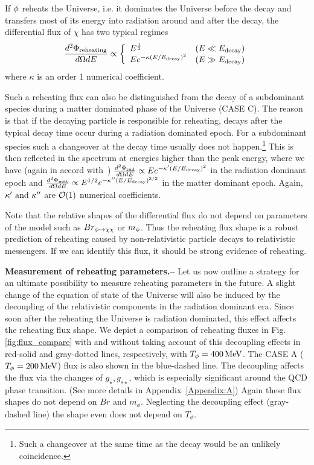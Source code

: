 \documentclass[superscriptaddress,aps,preprintnumbers,amsmath,showpacs,amssymb,prd,nofootinbib,reprint]{revtex4-1}
\begin{document}
If $\phi$ reheats the Universe, i.e. it dominates the Universe before the decay and transfers most of its energy into radiation around and after the decay, 
the differential flux of $\chi$ has two typical regimes 
\begin{align}
\frac{d^2\F_{\rm reheating}}{d \Omega d E} 
\propto 
\left\{\begin{array}{cc} 
 E^{\frac{1}{2}} ~~~~~~~~~~~~~~~~&(E\ll E_{\rm decay})\\  E e^{-\kappa(E/E_{\rm decay})^2 }& (E \gg E_{\rm decay})
\end{array}\right.\laq{rehflux}
\end{align}
where $\kappa$ is an order 1 numerical coefficient.


Such a reheating flux can also be distinguished from the decay of a subdominant species during a matter dominated phase of the Universe (CASE C). The reason is that if the decaying particle is responsible for reheating, decays after the typical decay time occur during a radiation dominated epoch. For a subdominant species such a changeover at the decay time usually does not happen.\footnote{Such a changeover at the same time as the decay would be an unlikely coincidence.} This is then reflected in the spectrum at energies higher than the peak energy, where we have (again in accord with~\cite{Conlon:2013isa})
$ \frac{d^2\Phi_{\rm rad}}{ d\Omega d E } \propto  E e^{-\kappa'(E/E_{\rm decay})^2 }$  
in the radiation dominant epoch and  
 $ \frac{d^2\Phi_{\rm mat}}{ d\Omega d E } 
\propto  E^{1/2} e^{-\kappa'' (E/E_{\rm decay})^{3/2} }$
in the matter dominant epoch. 
Again, $\kappa' ~{\rm and}~ \kappa''$ are $\mathcal{O}(1)$ numerical coefficients. 

Note that the relative shapes of the differential flux do not depend on parameters of the model such as {$Br_{\rm \phi \to \chi\chi}$} or $m_\phi$. Thus the reheating flux shape is a robust prediction of reheating caused by non-relativistic particle decays to relativistic messengers. If we can identify this flux, it should be strong evidence of reheating. 

{\bf Measurement of reheating parameters.--}
Let us now outline a strategy for an ultimate possibility to measure reheating parameters in the future.  
A slight change of the equation of state of the Universe will also be induced by the decoupling of the relativistic 
components in the radiation dominant era. Since soon after the reheating the Universe is radiation dominated, this effect affects the reheating flux shape. 
We depict a comparison of reheating fluxes in 
Fig.\,\ref{fig:flux_compare} with and without taking account of this decoupling effects in red-solid and gray-dotted lines, respectively, with 
$T_\phi=400{\rm \, MeV}$. The CASE A ($T_{\phi}=200\,{\rm MeV}$) flux is also shown in the blue-dashed line. The decoupling affects the flux via the changes of $g_{\star},g_{s \star}$, which is especially significant around the QCD phase transition. (See more details in Appendix~\ref{Appendix:A})
Again these flux shapes do not depend on  $Br$ and $m_\phi$.  Neglecting the decoupling effect (gray-dashed line) the shape even does not depend on $T_\phi.$
\end{document}
